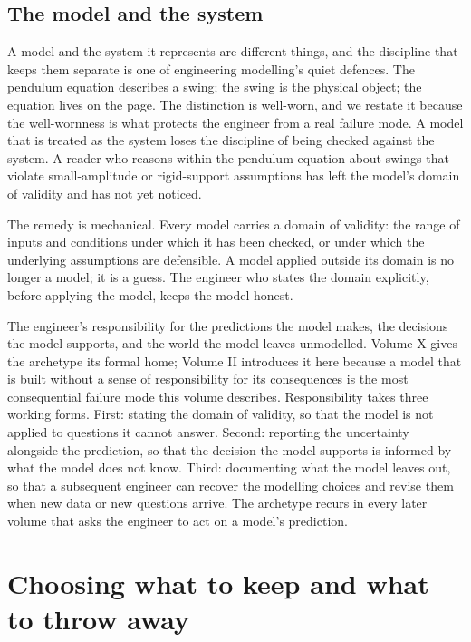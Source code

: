 \subsection{The model and the system}

A model and the system it represents are different things, and the
discipline that keeps them separate is one of engineering modelling's
quiet defences. The pendulum equation describes a swing; the swing is
the physical object; the equation lives on the page. The distinction
is well-worn, and we restate it because the well-wornness is what
protects the engineer from a real failure mode. A model that is
treated as the system loses the discipline of being checked against
the system. A reader who reasons within the pendulum equation about
swings that violate small-amplitude or rigid-support assumptions has
left the model's domain of validity and has not yet noticed.

The remedy is mechanical. Every model carries a domain of validity:
the range of inputs and conditions under which it has been checked,
or under which the underlying assumptions are defensible. A model
applied outside its domain is no longer a model; it is a guess. The
engineer who states the domain explicitly, before applying the model,
keeps the model honest.

\begin{archetype}
The engineer's responsibility for the predictions the model makes,
the decisions the model supports, and the world the model leaves
unmodelled. Volume X gives the archetype its formal home; Volume II
introduces it here because a model that is built without a sense of
responsibility for its consequences is the most consequential
failure mode this volume describes. Responsibility takes three
working forms. First: stating the domain of validity, so that the
model is not applied to questions it cannot answer. Second:
reporting the uncertainty alongside the prediction, so that the
decision the model supports is informed by what the model does not
know. Third: documenting what the model leaves out, so that a
subsequent engineer can recover the modelling choices and revise
them when new data or new questions arrive. The archetype recurs
in every later volume that asks the engineer to act on a model's
prediction.
\end{archetype}

\section{Choosing what to keep and what to throw away}

